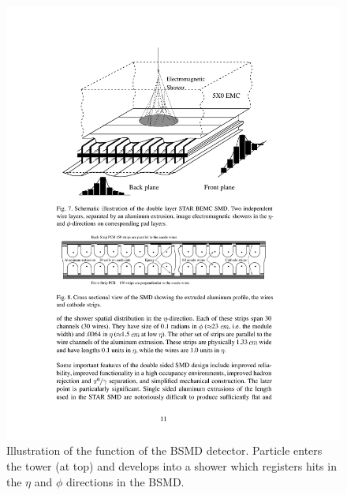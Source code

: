 \begin{figure}[htbp]
\begin{center}
\includegraphics[scale=1.0]{Plots/Detector/SMD.pdf}
\end{center}
\caption[BSMD Diagram]{Illustration of the function of the BSMD detector. Particle enters the tower (at top) and develops into a shower which registers hits in the $\eta$ and $\phi$ directions in the BSMD.}
\label{fig:SMD}
\end{figure}
